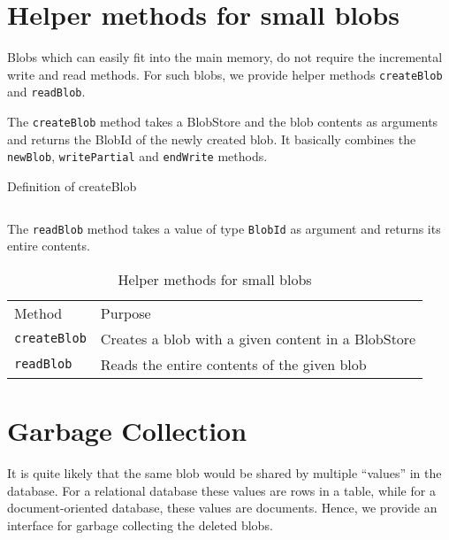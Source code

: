 \section{Helper methods for small blobs}
Blobs which can easily fit into the main memory, do not require the incremental write and read methods. For such blobs, we provide helper methods \texttt{createBlob} and \texttt{readBlob}.

The \texttt{createBlob} method takes a BlobStore and the blob contents as arguments and returns the BlobId of the newly created blob. It basically combines the \texttt{newBlob}, \texttt{writePartial} and \texttt{endWrite} methods.

\begin{program}
  \caption{Definition of createBlob}
  \label{fig:defcreateblob}
  \inputminted{haskell}{hs/createblob.hs}
\end{program}

The \texttt{readBlob} method takes a value of type \texttt{BlobId} as argument and returns its entire contents.

\begin{table}[hbt]
\caption{Helper methods for small blobs}
\label{tab:interface-small-blob}
\begin{center}
  \begin{tabularx}{0.91\textwidth}{lX}
    \hline\noalign{\smallskip}
    Method & Purpose \\
    \noalign{\smallskip}
    \hline
    \noalign{\smallskip}
    \texttt{createBlob} & Creates a blob with a given content in a BlobStore \\
    \texttt{readBlob} & Reads the entire contents of the given blob\\
    \hline
  \end{tabularx}
\end{center}
\end{table}


\section{Garbage Collection} \label{garbagecollection}
It is quite likely that the same blob would be shared by multiple ``values'' in the database. For a relational database these values are rows in a table, while for a document-oriented database, these values are documents.
Hence, we provide an interface for garbage collecting the deleted blobs.

